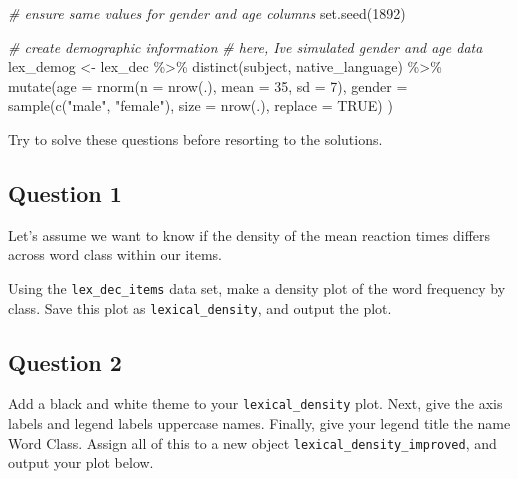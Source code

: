 \documentclass[
]{book}
\newenvironment{Shaded}{\begin{snugshade}}{\end{snugshade}}
\newcommand{\AttributeTok}[1]{\textcolor[rgb]{0.77,0.63,0.00}{#1}}
\newcommand{\CommentTok}[1]{\textcolor[rgb]{0.56,0.35,0.01}{\textit{#1}}}
\newcommand{\ConstantTok}[1]{\textcolor[rgb]{0.00,0.00,0.00}{#1}}
\newcommand{\DecValTok}[1]{\textcolor[rgb]{0.00,0.00,0.81}{#1}}
\newcommand{\FunctionTok}[1]{\textcolor[rgb]{0.00,0.00,0.00}{#1}}
\newcommand{\NormalTok}[1]{#1}
\newcommand{\OtherTok}[1]{\textcolor[rgb]{0.56,0.35,0.01}{#1}}
\newcommand{\SpecialCharTok}[1]{\textcolor[rgb]{0.00,0.00,0.00}{#1}}
\newcommand{\StringTok}[1]{\textcolor[rgb]{0.31,0.60,0.02}{#1}}
\begin{document}
\begin{Shaded}
\begin{Highlighting}[]
\CommentTok{\# ensure same values for gender and age columns}
\FunctionTok{set.seed}\NormalTok{(}\DecValTok{1892}\NormalTok{)}

\CommentTok{\# create demographic information}
\CommentTok{\# here, I\textquotesingle{}ve simulated gender and age data}
\NormalTok{lex\_demog }\OtherTok{\textless{}{-}}\NormalTok{ lex\_dec }\SpecialCharTok{\%\textgreater{}\%}
  \FunctionTok{distinct}\NormalTok{(subject, native\_language) }\SpecialCharTok{\%\textgreater{}\%}
  \FunctionTok{mutate}\NormalTok{(}\AttributeTok{age =} \FunctionTok{rnorm}\NormalTok{(}\AttributeTok{n =} \FunctionTok{nrow}\NormalTok{(.), }\AttributeTok{mean =} \DecValTok{35}\NormalTok{, }\AttributeTok{sd =} \DecValTok{7}\NormalTok{),}
         \AttributeTok{gender =} \FunctionTok{sample}\NormalTok{(}\FunctionTok{c}\NormalTok{(}\StringTok{"male"}\NormalTok{, }\StringTok{"female"}\NormalTok{), }
                      \AttributeTok{size =} \FunctionTok{nrow}\NormalTok{(.), }
                      \AttributeTok{replace =} \ConstantTok{TRUE}\NormalTok{)}
\NormalTok{         )}
\end{Highlighting}
\end{Shaded}

Try to solve these questions before resorting to the solutions.

\hypertarget{question-1-2}{%
\subsection{Question 1}\label{question-1-2}}

Let's assume we want to know if the density of the mean reaction times differs across word class within our items.

Using the \texttt{lex\_dec\_items} data set, make a density plot of the word frequency by class. Save this plot as \texttt{lexical\_density}, and output the plot.

\hypertarget{question-2-2}{%
\subsection{Question 2}\label{question-2-2}}

Add a black and white theme to your \texttt{lexical\_density} plot. Next, give the axis labels and legend labels uppercase names. Finally, give your legend title the name Word Class. Assign all of this to a new object \texttt{lexical\_density\_improved}, and output your plot below.
\end{document}

